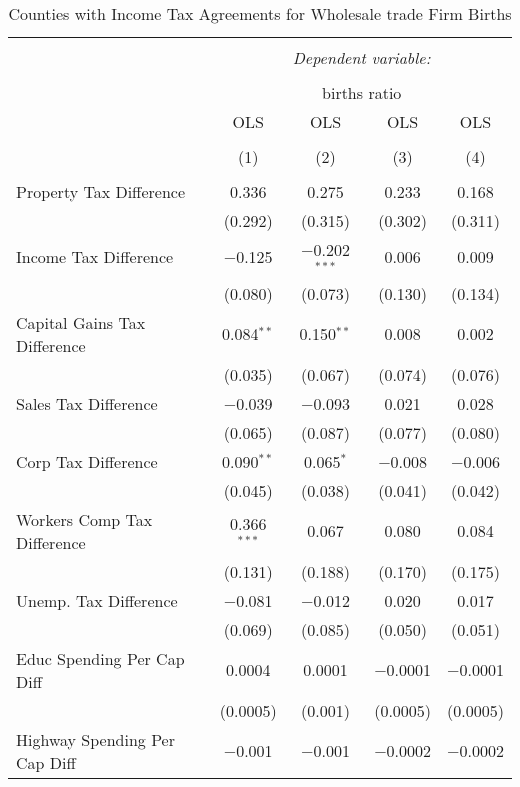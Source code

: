 
\begin{table}[!htbp] \centering 
  \caption{Counties with Income Tax Agreements for  Wholesale trade Firm Births} 
  \label{42rd} 
\begin{tabular}{@{\extracolsep{5pt}}lcccc} 
\\[-1.8ex]\hline 
\hline \\[-1.8ex] 
 & \multicolumn{4}{c}{\textit{Dependent variable:}} \\ 
\cline{2-5} 
\\[-1.8ex] & \multicolumn{4}{c}{births ratio} \\ 
 & OLS & OLS & OLS & OLS \\ 
\\[-1.8ex] & (1) & (2) & (3) & (4)\\ 
\hline \\[-1.8ex] 
 Property Tax Difference & 0.336 & 0.275 & 0.233 & 0.168 \\ 
  & (0.292) & (0.315) & (0.302) & (0.311) \\ 
  Income Tax Difference & $-$0.125 & $-$0.202$^{***}$ & 0.006 & 0.009 \\ 
  & (0.080) & (0.073) & (0.130) & (0.134) \\ 
  Capital Gains Tax Difference & 0.084$^{**}$ & 0.150$^{**}$ & 0.008 & 0.002 \\ 
  & (0.035) & (0.067) & (0.074) & (0.076) \\ 
  Sales Tax Difference & $-$0.039 & $-$0.093 & 0.021 & 0.028 \\ 
  & (0.065) & (0.087) & (0.077) & (0.080) \\ 
  Corp Tax Difference & 0.090$^{**}$ & 0.065$^{*}$ & $-$0.008 & $-$0.006 \\ 
  & (0.045) & (0.038) & (0.041) & (0.042) \\ 
  Workers Comp Tax Difference & 0.366$^{***}$ & 0.067 & 0.080 & 0.084 \\ 
  & (0.131) & (0.188) & (0.170) & (0.175) \\ 
  Unemp. Tax Difference & $-$0.081 & $-$0.012 & 0.020 & 0.017 \\ 
  & (0.069) & (0.085) & (0.050) & (0.051) \\ 
  Educ Spending Per Cap Diff & 0.0004 & 0.0001 & $-$0.0001 & $-$0.0001 \\ 
  & (0.0005) & (0.001) & (0.0005) & (0.0005) \\ 
  Highway Spending Per Cap Diff & $-$0.001 & $-$0.001 & $-$0.0002 & $-$0.0002 \\ 

\end{tabular}
\end{table}

